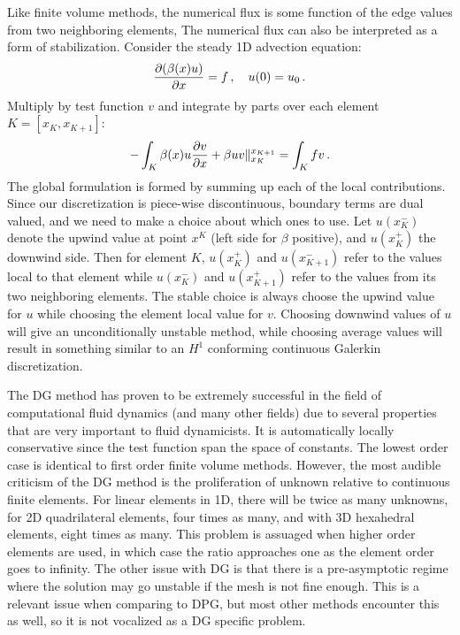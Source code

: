 \documentclass[Proposal.tex]{subfiles}
\begin{document}
Like finite volume methods, the numerical flux is some function of the edge values from two neighboring elements, 
The numerical flux can also be interpreted as a form of stabilization\cite{DGStabilization}.
Consider the steady 1D advection equation:
\[
\frac{\partial(\beta(x)u)}{\partial x}=f\,,\quad u(0)=u_0\,.
\]
Multiply by test function $v$ and integrate by parts over each element $K=[x_K,x_{K+1}]$:
\[
-\int_K\beta(x)u\frac{\partial v}{\partial x}+\beta uv\|_{x_K}^{x_{K+1}}=\int_K fv\,.
\]
The global formulation is formed by summing up each of the local contributions.
Since our discretization is piece-wise discontinuous, boundary terms are dual valued, and we need
to make a choice about which ones to use.
Let $u(x_K^-)$ denote the upwind value at point $x^K$ (left side for $\beta$ positive), and $u(x_K^+)$ the downwind side.
Then for element $K$, $u(x_K^+)$ and $u(x_{K+1}^-)$ refer to the values local to that element while $u(x_K^-)$ and $u(x_{K+1}^+)$ refer to the 
values from its two neighboring elements.
The stable choice is always choose the upwind value for $u$ while choosing the element local value for $v$.
Choosing downwind values of $u$ will give an unconditionally unstable method, while choosing average values will result in something similar
to an $H^1$ conforming continuous Galerkin discretization\cite{DGStabilization}.

The DG method has proven to be extremely successful in the field of computational fluid dynamics (and many other fields) due
to several properties that are very important to fluid dynamicists.
It is automatically locally conservative since the test function span the space of constants.
The lowest order case is identical to first order finite volume methods.
However, the most audible criticism of the DG method is the proliferation of unknown relative to continuous finite elements.
For linear elements in 1D, there will be twice as many unknowns, for 2D quadrilateral elements, four times as many, and with 3D hexahedral elements, eight
times as many. 
This problem is assuaged when higher order elements are used, in which case the ratio approaches one as the element order goes to infinity.
The other issue with DG is that there is a pre-asymptotic regime where the solution may go unstable if the mesh is not fine enough.
This is a relevant issue when comparing to DPG, but most other methods encounter this as well, so it is not vocalized as a DG specific problem.
\end{document}
